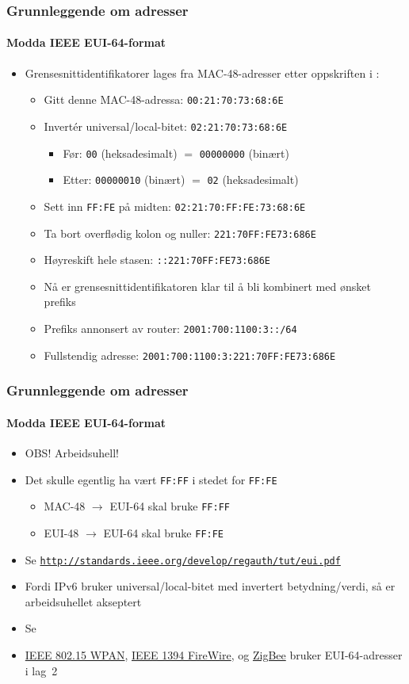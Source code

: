 \begin{frame}
  \frametitle{Grunnleggende om adresser}
  \framesubtitle{Modda IEEE EUI-64-format}
  \begin{itemize}
  \item Grensesnittidentifikatorer lages fra MAC-48-adresser etter
    oppskriften i :
    \begin{itemize}
    \item Gitt denne MAC-48-adressa: \texttt{00:21:70:73:68:6E}
    \item Invertér universal/local-bitet: \texttt{0\alert{2}:21:70:73:68:6E}
      \begin{itemize}
      \item Før: \texttt{0\alert{0}} (heksadesimalt) \({}={}\) \texttt{000000\alert{0}0} (binært)
      \item Etter: \texttt{000000\alert{1}0} (binært) \({}={}\) \texttt{0\alert{2}} (heksadesimalt)
      \end{itemize}
    \item Sett inn \texttt{FF:FE} på midten: \texttt{02:21:70:\alert{FF:FE}:73:68:6E}
    \item Ta bort overflødig kolon og nuller: \texttt{221:70FF:FE73:686E}
    \item Høyreskift hele stasen: \texttt{::221:70FF:FE73:686E}
    \item Nå er grensesnittidentifikatoren klar til å bli kombinert med ønsket prefiks
    \item Prefiks annonsert av router: \texttt{2001:700:1100:3::/64}
    \item Fullstendig adresse: \texttt{2001:700:1100:3:221:70FF:FE73:686E}
    \end{itemize}
  \end{itemize}
\end{frame}

\begin{frame}
  \frametitle{Grunnleggende om adresser}
  \framesubtitle{Modda IEEE EUI-64-format}
  \begin{itemize}
  \item OBS! Arbeidsuhell!
  \item Det skulle egentlig ha vært \texttt{FF:FF} i stedet for
    \texttt{FF:FE}
    \begin{itemize}
    \item MAC-48 \(\to\) EUI-64 skal bruke \texttt{FF:FF}
    \item EUI-48 \(\to\) EUI-64 skal bruke \texttt{FF:FE}
    \end{itemize}
  \item Se \texttt{\url{http://standards.ieee.org/develop/regauth/tut/eui.pdf}}
  \item Fordi IPv6 bruker universal/local-bitet med invertert
    betydning/verdi, så er arbeidsuhellet akseptert
  \item Se 
  \item \href{http://en.wikipedia.org/wiki/IEEE_802.15}{IEEE 802.15
      WPAN}, \href{http://en.wikipedia.org/wiki/IEEE_1394}{IEEE 1394
      FireWire}, og \href{http://en.wikipedia.org/wiki/ZigBee}{ZigBee}
    bruker EUI-64-adresser i lag~2
  \end{itemize}
\end{frame}

